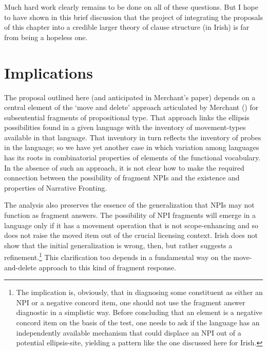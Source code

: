 \documentclass[output=paper,colorlinks,citecolor=brown]{langscibook}
\begin{document}
Much hard work clearly remains to be done on all of these questions. But I hope to have shown in this brief discussion that the project of integrating the proposals of this chapter into a credible larger theory of clause structure (in Irish) is far from being a hopeless one.

\section{Implications}
\label{sec:implications}

The proposal outlined here (and anticipated in Merchant's paper) depends on a central element of the `move and delete' approach articulated by Merchant (\citeyear{merchant:04}) for subsentential fragments of propositional type.  That approach links the ellipsis possibilities found in a given language with the inventory of movement-types available in that language. That inventory in turn reflects the inventory of probes in the language; so we have yet another case in which variation among languages has its roots in combinatorial properties of elements of the functional vocabulary. In the absence of such an approach, it is not clear how to make the required connection between the possibility of fragment NPIs and the existence and properties of Narrative Fronting.

The analysis also preserves the essence of the generalization that NPIs may not function as fragment answers. The possibility of NPI fragments will emerge in a language only if it has a movement operation that is not scope-enhancing and so does not raise the moved item out of the crucial licensing context.  Irish does not show that the initial generalization is wrong, then, but rather suggests a refinement.\footnote{The implication is, obviously, that in diagnosing some constituent as either an NPI or a negative concord item, one should not use the fragment answer diagnostic in a simplistic way. Before concluding that an element is a negative concord item on the basis of the test, one needs to ask if the language has an independently available mechanism that could displace an NPI out of a potential ellipsis-site, yielding a pattern like the one discussed here for Irish.} This clarification too depends in a fundamental way on the move-and-delete approach to this kind of fragment response.
\end{document}
